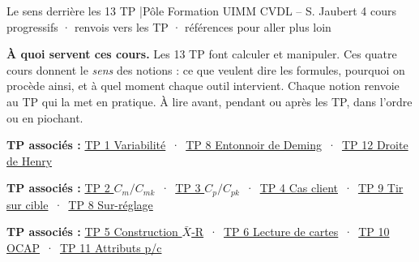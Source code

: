 \documentclass[11pt]{article}
\newcommand{\tplink}[2]{\href{../TP_Activites/#1}{#2}}
\begin{document}
{Le sens derrière les 13 TP \quad|\quad Pôle Formation UIMM CVDL – S. Jaubert}
{4 cours progressifs · renvois vers les TP · références pour aller plus loin}

\begin{lead}
\textbf{\color{uimmblue}À quoi servent ces cours.} Les 13 TP font calculer et manipuler. Ces quatre cours donnent le \emph{sens} des notions : ce que veulent dire les formules, pourquoi on procède ainsi, et à quel moment chaque outil intervient. Chaque notion renvoie au TP qui la met en pratique. À lire avant, pendant ou après les TP, dans l'ordre ou en piochant.
\end{lead}

\noindent\hspace{6pt}\textbf{\footnotesize\color{uimmgrey}TP associés :} \footnotesize \tplink{TP1_Decouverte_Variabilite.html}{TP 1 Variabilité} \,·\, \tplink{TP08_Entonnoir_Deming_Sur-reglage.html}{TP 8 Entonnoir de Deming} \,·\, \tplink{TP12_Normalite_Droite_Henry.html}{TP 12 Droite de Henry}
\medskip

\noindent\hspace{6pt}\textbf{\footnotesize\color{uimmgrey}TP associés :} \footnotesize \tplink{TP2_Capabilite_Machine_Cm_Cmk.html}{TP 2 $C_m/C_{mk}$} \,·\, \tplink{TP3_Capabilite_Procede_Cp_Cpk.html}{TP 3 $C_p/C_{pk}$} \,·\, \tplink{TP4_Cas_Client_Cpk_Exige.html}{TP 4 Cas client} \,·\, \tplink{TP09_Tir_sur_Cible_Cp_Cpk.html}{TP 9 Tir sur cible} \,·\, \tplink{TP08_Entonnoir_Deming_Sur-reglage.html}{TP 8 Sur-réglage}
\medskip

\noindent\hspace{6pt}\textbf{\footnotesize\color{uimmgrey}TP associés :} \footnotesize \tplink{TP5_Construction_Carte_XbarR.html}{TP 5 Construction $\bar{X}$-R} \,·\, \tplink{TP6_Lecture_Cartes_Normal_Alarme.html}{TP 6 Lecture de cartes} \,·\, \tplink{TP10_OCAP_Reaction_Alarme.html}{TP 10 OCAP} \,·\, \tplink{TP11_Carte_Attributs_P_C.html}{TP 11 Attributs p/c}
\medskip
\end{document}
